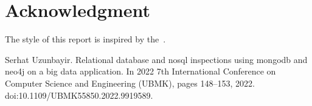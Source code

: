 \documentclass[conference]{IEEEtran}
\begin{document}
\section*{Acknowledgment}

The style of this report is inspired by the~\cite{uzunbayir}.


\begin{thebibliography}{00}
     Serhat Uzunbayir. Relational database and nosql inspections using mongodb and neo4j on a big data application.
    In 2022 7th International Conference on Computer Science and Engineering (UBMK), pages 148--153, 2022.
    doi:10.1109/UBMK55850.2022.9919589.
\end{thebibliography}
\end{document}

